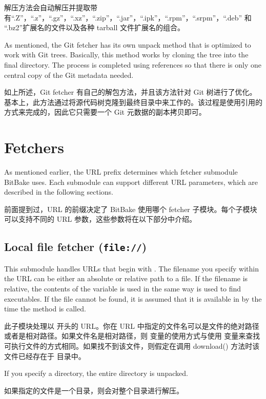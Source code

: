 解压方法会自动解压并提取带有``.Z''，``.z''，``.gz''，``.xz''，``.zip''，``.jar''，``.ipk''，``.rpm''，``.srpm''，``.deb'' 和 ``.bz2''扩展名的文件以及各种 tarball 文件扩展名的组合。

As mentioned, the Git fetcher has its own unpack method that is optimized to work with Git trees. Basically, this method works by cloning the tree into the final directory. The process is completed using references so that there is only one central copy of the Git metadata needed.

如上所述，Git fetcher 有自己的解包方法，并且该方法针对 Git 树进行了优化。基本上，此方法通过将源代码树克隆到最终目录中来工作的。该过程是使用引用的方式来完成的，因此它只需要一个 Git 元数据的副本拷贝即可。

\section{Fetchers}

As mentioned earlier, the URL prefix determines which fetcher submodule BitBake uses. Each submodule can support different URL parameters, which are described in the following sections.

前面提到过，URL 的前缀决定了 BitBake 使用哪个 fetcher 子模块。每个子模块可以支持不同的 URL 参数，这些参数将在以下部分中介绍。

\subsection{Local file fetcher (\texttt{file://})}

This submodule handles URLs that begin with . The filename you specify within the URL can be either an absolute or relative path to a file. If the filename is relative, the contents of the  variable is used in the same way  is used to find executables. If the file cannot be found, it is assumed that it is available in  by the time the  method is called.

此子模块处理以  开头的 URL。你在 URL 中指定的文件名可以是文件的绝对路径或者是相对路径。如果文件名是相对路径，则  变量的使用方式与使用  变量来查找可执行文件的方式相同。如果找不到该文件，则假定在调用 download() 方法时该文件已经存在于  目录中。

If you specify a directory, the entire directory is unpacked.

如果指定的文件是一个目录，则会对整个目录进行解压。

